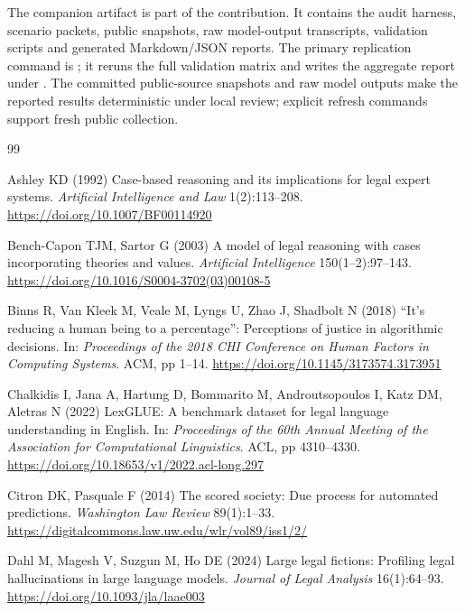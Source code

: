 \documentclass[12pt,a4paper]{article}
\begin{document}
The companion artifact is part of the contribution. It contains the audit harness, scenario packets, public snapshots, raw model-output transcripts, validation scripts and generated Markdown/JSON reports. The primary replication command is ; it reruns the full validation matrix and writes the aggregate report under . The committed public-source snapshots and raw model outputs make the reported results deterministic under local review; explicit refresh commands support fresh public collection.

\begin{thebibliography}{99}

Ashley KD (1992) Case-based reasoning and its implications for legal expert systems. \textit{Artificial Intelligence and Law} 1(2):113--208. \url{https://doi.org/10.1007/BF00114920}

Bench-Capon TJM, Sartor G (2003) A model of legal reasoning with cases incorporating theories and values. \textit{Artificial Intelligence} 150(1--2):97--143. \url{https://doi.org/10.1016/S0004-3702(03)00108-5}

Binns R, Van Kleek M, Veale M, Lyngs U, Zhao J, Shadbolt N (2018) ``It's reducing a human being to a percentage'': Perceptions of justice in algorithmic decisions. In: \textit{Proceedings of the 2018 CHI Conference on Human Factors in Computing Systems}. ACM, pp 1--14. \url{https://doi.org/10.1145/3173574.3173951}

Chalkidis I, Jana A, Hartung D, Bommarito M, Androutsopoulos I, Katz DM, Aletras N (2022) LexGLUE: A benchmark dataset for legal language understanding in English. In: \textit{Proceedings of the 60th Annual Meeting of the Association for Computational Linguistics}. ACL, pp 4310--4330. \url{https://doi.org/10.18653/v1/2022.acl-long.297}

Citron DK, Pasquale F (2014) The scored society: Due process for automated predictions. \textit{Washington Law Review} 89(1):1--33. \url{https://digitalcommons.law.uw.edu/wlr/vol89/iss1/2/}

Dahl M, Magesh V, Suzgun M, Ho DE (2024) Large legal fictions: Profiling legal hallucinations in large language models. \textit{Journal of Legal Analysis} 16(1):64--93. \url{https://doi.org/10.1093/jla/laae003}


\end{thebibliography}
\end{document}
